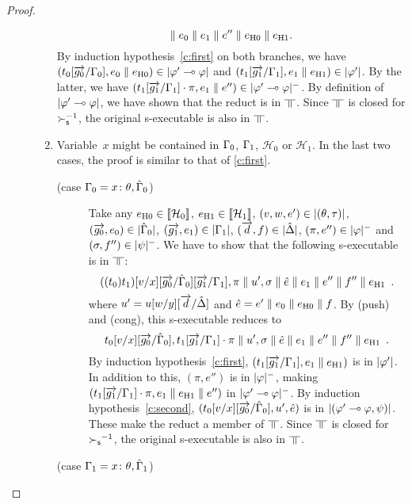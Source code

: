 \begin{proof}
\begin{description}
\begin{enumerate}[label=\textit{(\arabic{*})}]
\[	       \parallel {e_0}\parallel {e_1}\parallel e''\parallel e_{\mathrm{H0}}\parallel e_{\mathrm{H1}}.
	       \]
	       By induction hypothesis~\ref{c:first} on both branches,
	       we have $(t_0[\overrightarrow{g_0}/\Gamma_0],
	       {e_0\parallel e_{\mathrm{H0}}})\in|{\varphi'\multimap\varphi}|$
	       and
	       $(t_1[\overrightarrow{g_1}/\Gamma_1],{e_1\parallel e_{\mathrm{H1}}})\in|{\varphi'}|$.
	       By the latter, we have $(t_1[\overrightarrow{g_1}/\Gamma_1]\cdot\pi,
	       {e_1}\parallel e'')\in|{\varphi'\multimap\varphi}|^-$.
	       By definition of $|{\varphi'\multimap\varphi}|$, we have shown that the
	       reduct is in $\bbot$.
	       Since $\bbot$ is closed for $\succ_{\mathsf s}^{-1}$,
	       the original s-executable is also in $\bbot$.
	 \item Variable~$x$ might be contained in $\Gamma_0$, $\Gamma_1$,
	       $\mathcal H_0$ or $\mathcal H_1$.
	       In the last two cases, the proof is similar to that of
	       \ref{c:first}.
	       \begin{description}
		\item[(case $\Gamma_0 = {x} \colon{\theta},\hat{\Gamma}_0$)]
		     Take any
		     $e_{\mathrm{H0}}\in\llbracket{\mathcal H_0}\rrbracket$,
		     $e_{\mathrm{H1}}\in\llbracket{\mathcal H_1}\rrbracket$,
		     $(v,w,e')\in|{(\theta,\tau)}|$,
		     $(\overrightarrow{g_0},{e_0})\in|{\hat{\Gamma}_0}|$,
		     $(\overrightarrow{g_1},{e_1})\in|{\Gamma_1}|$,
		     $(\overrightarrow{d},{f})\in|{\hat{\Delta}}|$,
		     $(\pi,e'')\in|{\varphi}|^-$ and
		     $(\sigma,f'')\in|{\psi}|^-$.
		     We have to show that the following s-executable is in
		     $\bbot$:
		     \[
		     ((t_0)t_1)[v/x][\overrightarrow{g_0}/\hat{\Gamma}_0][\overrightarrow{g_1}/\Gamma_1],\pi\parallel
		     u' ,\sigma\parallel \hat e\parallel {{e_1}}\parallel
		     {e''}\parallel{f''}\parallel e_{\mathrm{H1}}\enspace.
		     \]
		     where
		     $u' = u[w/y][\overrightarrow{d}/\hat{\Delta}]$ and
		     $\hat e= e'\parallel {e_0}\parallel e_{\mathrm{H0}}\parallel {f}$.
		     By (push) and (cong), this s-executable reduces to
		     \[
		     t_0[v/x][\overrightarrow{g_0}/\hat{\Gamma}_0],
		     t_1[\overrightarrow{g_1}/\Gamma_1]\cdot\pi
		     \parallel
		     u' ,\sigma\parallel \hat e\parallel {{e_1}}\parallel
		     {e''}\parallel{f''}\parallel e_{\mathrm{H1}}\enspace.
		     \]
		     By induction hypothesis~\ref{c:first},
		     $(t_1[\overrightarrow{g_1}/\Gamma_1],{e_1\parallel e_{\mathrm{H1}}})$ is in $|{\varphi'}|$.
		     In addition to this, $(\pi,e'')$ is in $|{\varphi}|^-$,
		     making $(t_1[\overrightarrow{g_1}/\Gamma_1]\cdot\pi, {e_1\parallel e_{\mathrm{H1}}}\parallel e'')$ in
		     $|{\varphi'\multimap\varphi}|^-$.
		     By induction hypothesis~\ref{c:second},
		     $(t_0[v/x][\overrightarrow{g_0}/\hat{\Gamma}_0], u', \hat e)$ is in
		     $|{(\varphi'\multimap\varphi,\psi)}|$.
		     These make the reduct a member of $\bbot$.
		     Since $\bbot$ is closed for ${\succ_{\mathsf s}}^{-1}$, the original
		     s-executable is also in $\bbot$.
		\item[(case $\Gamma_1 = {x} \colon{\theta},\hat{\Gamma}_1$)]

\end{description}
\end{enumerate}
\end{description}
\end{proof}
